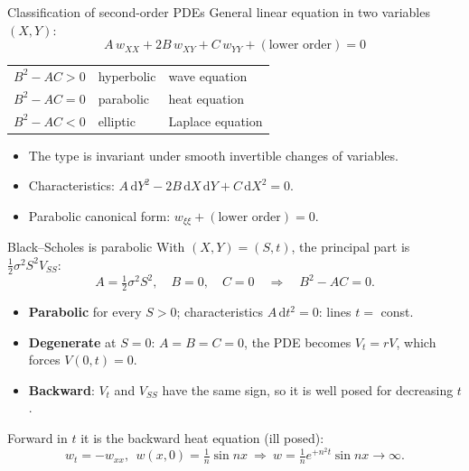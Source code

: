 \documentclass[11pt]{beamer}
\newcommand{\dd}{\,\mathrm d}
\begin{document}
\begin{frame}{Classification of second-order PDEs}
  General linear equation in two variables $(X,Y)$:
  \[
    A\,w_{XX}+2B\,w_{XY}+C\,w_{YY}+(\text{lower order})=0
  \]
  \begin{center}
  \begin{tabular}{lll}
    \toprule
    $B^2-AC>0$ & hyperbolic & wave equation\\
    $B^2-AC=0$ & parabolic & heat equation\\
    $B^2-AC<0$ & elliptic & Laplace equation\\
    \bottomrule
  \end{tabular}
  \end{center}
  \begin{itemize}
    \item The type is invariant under smooth invertible changes of variables.
    \item Characteristics: $A\dd Y^2-2B\dd X\dd Y+C\dd X^2=0$.
    \item Parabolic canonical form: $w_{\xi\xi}+(\text{lower order})=0$.
  \end{itemize}
\end{frame}

\begin{frame}{Black--Scholes is parabolic}
  With $(X,Y)=(S,t)$, the principal part is $\tfrac12\sigma^2S^2V_{SS}$:
  \[
    A=\tfrac12\sigma^2S^2,\quad B=0,\quad C=0\quad\Rightarrow\quad B^2-AC=0 .
  \]
  \begin{itemize}
    \item \textbf{Parabolic} for every $S>0$; characteristics $A\dd t^2=0$: lines $t=$ const.
    \item \textbf{Degenerate} at $S=0$: $A=B=C=0$, the PDE becomes $V_t=rV$, which forces $V(0,t)=0$.
    \item \textbf{Backward}: $V_t$ and $V_{SS}$ have the same sign, so it is well posed for decreasing $t$.
  \end{itemize}
  \vspace{4pt}
  Forward in $t$ it is the backward heat equation (ill posed):
  \[
    w_t=-w_{xx},\ \ w(x,0)=\tfrac1n\sin nx\ \Rightarrow\ w=\tfrac1n e^{+n^2t}\sin nx\to\infty .
  \]
\end{frame}
\end{document}
